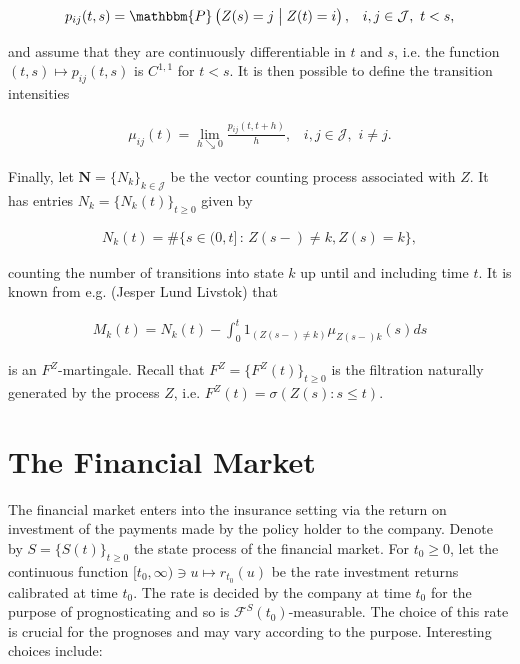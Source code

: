 \documentclass{book}
\newcommand{\1}[1]{\mathbbm{1}_{\left\lbrace #1 \right\rbrace}}
\theoremstyle{break}
\theoremstyle{remark}
\numberwithin{equation}{section}
\begin{document}
\begin{align*}
    p_{ij}(t,s) =  \mathbbm{P} \left( Z(s)=j \;\middle\vert\; Z(t)=i \right), \, \, \, \, \, i,j \in \mathcal{J}, \, \, t < s,
\end{align*}

and assume that they are continuously differentiable in $t$ and $s$, i.e. the function $(t,s) \mapsto p_{ij}(t,s)$ is $C^{1,1}$ for $t < s$. It is then possible to define the transition intensities

\begin{align*}
    \mu_{ij}(t) = \lim_{h \searrow 0} \frac{p_{ij} \left( t,t+h \right)}{h}, \, \, \, \, \, i,j \in \mathcal{J}, \, \, i \neq j.
\end{align*}

Finally, let $\textbf{N} = \{ N_{k} \}_{k \in \mathcal{J}}$ be the vector counting process associated with $Z$. It has entries $N_{k} = \{ N_{k}(t) \}_{t \geq 0}$ given by

\begin{align*}
    N_{k}(t) = \# \{ s \in (0,t] \, : \, Z(s-) \neq k, Z(s)=k \},
\end{align*}

counting the number of transitions into state $k$ up until and including time $t$. It is known from e.g. (Jesper Lund Livstok) that

\begin{align*}
    M_{k}(t) = N_{k}(t) - \int_0^t 1_{( Z(s-) \neq k)} \mu_{Z(s-)k}(s)ds
\end{align*}

is an $F^Z$-martingale. Recall that $F^Z= \{ F^Z(t) \}_{t \geq 0}$ is the filtration naturally generated by the process $Z$, i.e. $F^Z(t) = \sigma(Z(s) : s \leq t)$.

\section{The Financial Market}

The financial market enters into the insurance setting via the return on investment of the payments made by the policy holder to the company. Denote by $S = \{ S(t) \}_{t \geq 0}$ the state process of the financial market. For $t_0 \geq 0$, let the continuous function $[t_0,\infty) \ni u \mapsto r_{t_0}(u)$ be the rate investment returns calibrated at time $t_0$. The rate is decided by the company at time $t_0$ for the purpose of prognosticating and so is $\mathcal{F}^{S}(t_0)$-measurable. The choice of this rate is crucial for the prognoses and may vary according to the purpose. Interesting choices include:
\end{document}

